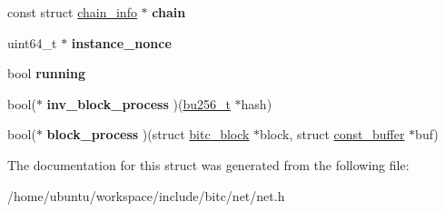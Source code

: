 \begin{DoxyCompactItemize}
\item 
\hypertarget{structnet__child__info_ab6ee72882f9813d4e3d31e98ed9ddaef}{const struct \hyperlink{structchain__info}{chain\-\_\-info} $\ast$ {\bfseries chain}}\label{structnet__child__info_ab6ee72882f9813d4e3d31e98ed9ddaef}

\item 
\hypertarget{structnet__child__info_adbc9e7ec9aaa38f698072618fa39b171}{uint64\-\_\-t $\ast$ {\bfseries instance\-\_\-nonce}}\label{structnet__child__info_adbc9e7ec9aaa38f698072618fa39b171}

\item 
\hypertarget{structnet__child__info_aaf37da9f4fb518f3953c4d7d547894a2}{bool {\bfseries running}}\label{structnet__child__info_aaf37da9f4fb518f3953c4d7d547894a2}

\item 
\hypertarget{structnet__child__info_a3794a222d2d15ef9e68f0ad666bd130d}{bool($\ast$ {\bfseries inv\-\_\-block\-\_\-process} )(\hyperlink{structbu256}{bu256\-\_\-t} $\ast$hash)}\label{structnet__child__info_a3794a222d2d15ef9e68f0ad666bd130d}

\item 
\hypertarget{structnet__child__info_a081f98ace6dec96c7749e79e40cb36e7}{bool($\ast$ {\bfseries block\-\_\-process} )(struct \hyperlink{structbitc__block}{bitc\-\_\-block} $\ast$block, struct \hyperlink{structconst__buffer}{const\-\_\-buffer} $\ast$buf)}\label{structnet__child__info_a081f98ace6dec96c7749e79e40cb36e7}

\end{DoxyCompactItemize}


The documentation for this struct was generated from the following file\-:\begin{DoxyCompactItemize}
\item 
/home/ubuntu/workspace/include/bitc/net/net.\-h\end{DoxyCompactItemize}

